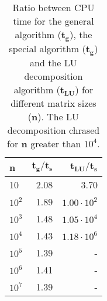 \begin{table}[htbp]
	\centering
	\begin{tabular}{lrr}
		\textbf{n} & $\mathbf{{t_g}/{t_s}}$ & $\mathbf{{t_{LU}}/{t_s}}$  \\
		\midrule
		\addlinespace[0.1cm]
		
		10         & 2.08                                                                                          & 3.70                                                                                        \\
		$10^2$       & 1.89                                                                                          & $1.00\cdot 10^2 $                                                                                         \\
		$10^3$       & 1.48                                                                                          & $1.05 \cdot 10^4 $                                                                                        \\
		$10^4$       & 1.43                                                                                          & $1.18 \cdot 10^6$                                                                                         \\
		$10^5$       & 1.39                                                                                          & -                                                                                         \\
		$10^6$       & 1.41                                                                                          & -                                                                                        \\
		$10^7$       & 1.39                                                                                          &    -                                                                                    
	\end{tabular}  \caption{Ratio between CPU time for the general algorithm ($\mathbf{t_g}$), the special algorithm ($\mathbf{t_g}$) and the LU decomposition algorithm ($\mathbf{t_{LU}}$) for different matrix sizes (\textbf{n}). The LU decomposition chrased for \textbf{n} greater than $10^4$.} \label{table:time}
\end{table} 
